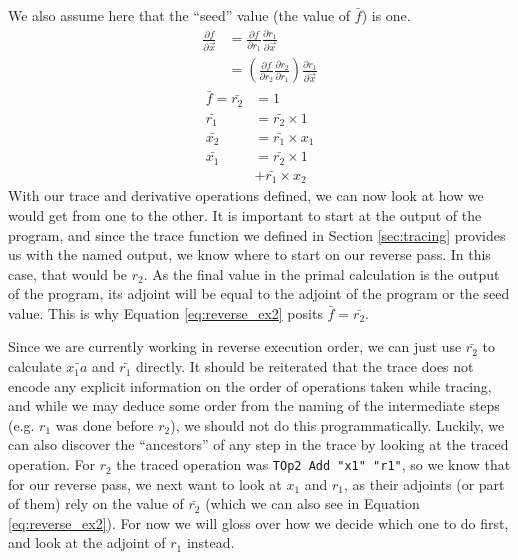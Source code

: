     We also assume here that the ``seed'' value (the value of $\bar{f}$) is one.
    \begin{equation} \label{eq:reverse_ex}
        \begin{aligned}
            \frac{\partial f}{\partial\vec{x}}&=\frac{\partial f}{\partial r_1}\frac{\partial r_1}{\partial\vec{x}}\\
            &=\left(\frac{\partial f}{\partial r_2}\frac{\partial r_2}{\partial r_1}\right)\frac{\partial r_1}{\partial\vec{x}}
        \end{aligned}
    \end{equation}
    \begin{equation} \label{eq:reverse_ex2}
        \begin{aligned}
            \bar{f}=\bar{r_2}&=1\\
            \bar{r_1}&=\bar{r_2}\times1\\
            \bar{x_2}&=\bar{r_1}\times x_1\\
            \bar{x_1}&=\bar{r_2}\times1\\
            &+\bar{r_1}\times x_2
        \end{aligned}
    \end{equation}
    With our trace and derivative operations defined, we can now look at how we would get from one to the other.
    It is important to start at the output of the program, and since the trace function we defined in Section \ref{sec:tracing} provides us with the named output, we know where to start on our reverse pass.
    In this case, that would be $r_2$.
    As the final value in the primal calculation is the output of the program, its adjoint will be equal to the adjoint of the program or the seed value.
    This is why Equation \ref{eq:reverse_ex2} posits $\bar{f}=\bar{r_2}$.

    Since we are currently working in reverse execution order, we can just use $\bar{r_2}$ to calculate $\bar{x_1a}$ and $\bar{r_1}$ directly.
    It should be reiterated that the trace does not encode any explicit information on the order of operations taken while tracing, and while we may deduce some order from the naming of the intermediate steps (e.g. $r_1$ was done before $r_2$), we should not do this programmatically.
    Luckily, we can also discover the ``ancestors'' of any step in the trace by looking at the traced operation.
    For $r_2$ the traced operation was \texttt{TOp2 Add "x1" "r1"}, so we know that for our reverse pass, we next want to look at $x_1$ and $r_1$, as their adjoints (or part of them) rely on the value of $\bar{r_2}$ (which we can also see in Equation \ref{eq:reverse_ex2}).
    For now we will gloss over how we decide which one to do first, and look at the adjoint of $r_1$ instead.
    
